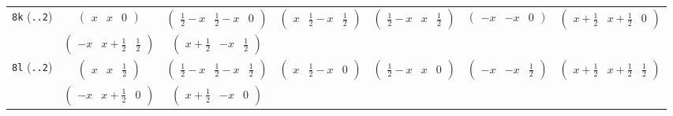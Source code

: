 \documentclass[fleqn,9pt,landscape]{jsarticle}
\begin{document}
\begin{center}
\begin{longtable}{ccccccc}
{\tt 8k} ({\tt ..2}) & $ \begin{pmatrix} x & x & 0 \end{pmatrix} $ & $ \begin{pmatrix} \frac{1}{2} - x & \frac{1}{2} - x & 0 \end{pmatrix} $ & $ \begin{pmatrix} x & \frac{1}{2} - x & \frac{1}{2} \end{pmatrix} $ & $ \begin{pmatrix} \frac{1}{2} - x & x & \frac{1}{2} \end{pmatrix} $ & $ \begin{pmatrix} - x & - x & 0 \end{pmatrix} $ & $ \begin{pmatrix} x + \frac{1}{2} & x + \frac{1}{2} & 0 \end{pmatrix} $ \\
& $ \begin{pmatrix} - x & x + \frac{1}{2} & \frac{1}{2} \end{pmatrix} $ & $ \begin{pmatrix} x + \frac{1}{2} & - x & \frac{1}{2} \end{pmatrix} $ & $  $ & $  $ & $  $ & $  $ \\ \hline
{\tt 8l} ({\tt ..2}) & $ \begin{pmatrix} x & x & \frac{1}{2} \end{pmatrix} $ & $ \begin{pmatrix} \frac{1}{2} - x & \frac{1}{2} - x & \frac{1}{2} \end{pmatrix} $ & $ \begin{pmatrix} x & \frac{1}{2} - x & 0 \end{pmatrix} $ & $ \begin{pmatrix} \frac{1}{2} - x & x & 0 \end{pmatrix} $ & $ \begin{pmatrix} - x & - x & \frac{1}{2} \end{pmatrix} $ & $ \begin{pmatrix} x + \frac{1}{2} & x + \frac{1}{2} & \frac{1}{2} \end{pmatrix} $ \\
& $ \begin{pmatrix} - x & x + \frac{1}{2} & 0 \end{pmatrix} $ & $ \begin{pmatrix} x + \frac{1}{2} & - x & 0 \end{pmatrix} $ & $  $ & $  $ & $  $ & $  $ \\ \hline

\end{longtable}
\end{center}
\end{document}
